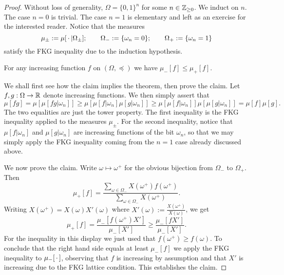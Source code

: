 \begin{proof}
    Without loss of generality, $\Omega=\{0,1\}^n$ for some $n\in\mathbb Z_{\geq 0}$.
    We induct on $n$.
    The case $n=0$ is trivial.
    The case $n=1$ is elementary and left as an exercise for the interested reader.
    Notice that the measures
    \[
        \mu_\pm:=\mu[\,\cdot\,|\Omega_\pm];
        \qquad
        \Omega_-:=\{\omega_n=0\};
        \qquad
        \Omega_+:=\{\omega_n=1\}
    \]
    satisfy the FKG inequality due to the induction hypothesis.

    \begin{claim*}
    For any increasing function $f$  on $(\Omega,\preceq)$ we have \(
            \mu_-[f]\leq\mu_+[f]
        \).
    \end{claim*}

    We shall first see how the claim implies the theorem,
    then prove the claim.
    Let $f,g:\Omega\to\mathbb R$ denote increasing functions.
    We then simply assert that
    \[
        \mu[fg] = \mu[\mu[fg|\omega_n]]
        \geq
        \mu[\mu[f|\omega_n]\mu[g|\omega_n]]
        \geq
        \mu[\mu[f|\omega_n]]\mu[\mu[g|\omega_n]]
        =
        \mu[f]\mu[g].
    \]
    The two equalities are just the tower property.
    The first inequality is the FKG inequality applied
    to the measures $\mu_\pm$.
    For the second inequality, notice that $\mu[f|\omega_n]$
    and $\mu[g|\omega_n]$ are increasing functions
    of the bit $\omega_n$,
    so that we may simply apply the FKG inequality
    coming from the $n=1$ case already discussed above.

    We now prove the claim.
    Write $\omega\mapsto \omega^+$ for the obvious bijection
    from $\Omega_-$ to $\Omega_+$.
    Then
    \[
        \mu_+[ f]
        =
        \frac{\sum_{\omega\in\Omega_-}X(\omega^+)f(\omega^+)}{\sum_{\omega\in\Omega_-}X(\omega^+)}.
    \]
    Writing $X(\omega^+)=X(\omega)X'(\omega)$
    where
    $X'(\omega):=\frac{X(\omega^+)}{X(\omega)}$,
    we get 
    \[
        \mu_+[ f]
        =
        \frac{\mu_-[ f(\omega^+) X']}{\mu_-[ X']}
        \geq
        \frac{\mu_-[ f X']}{\mu_-[ X']}
        .
    \]
    For the inequality in this display we just used that $f(\omega^+)\geq f(\omega)$.
    To conclude that the right hand side equals at least $\mu_-[ f]$
    we apply the FKG inequality to $\mu_-[\,\cdot\,]$,
    observing that $f$ is increasing by assumption and that $X'$ is increasing
    due to the FKG lattice condition.
    This establishes the claim.
\end{proof}


